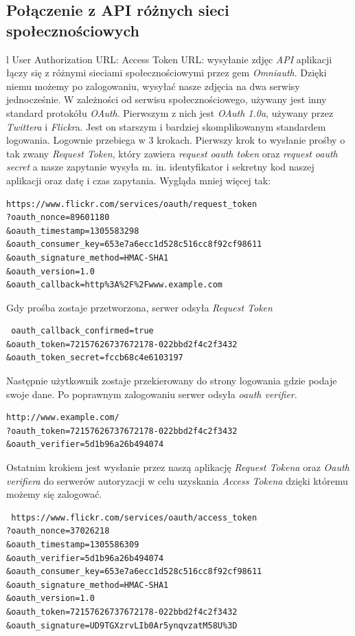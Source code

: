 \documentclass[openright]{xmgr}
\begin{document}
\subsection{Połączenie z API różnych sieci społecznościowych} l User Authorization URL: Access Token URL: wysyłanie zdjęc
\textit{API} aplikacji łączy się z różnymi sieciami społecznościowymi przez gem \textit{Omniauth}. Dzięki niemu możemy po zalogowaniu, wysyłać nasze zdjęcia na dwa serwisy jednocześnie. W zależności od serwisu społecznościowego, używany jest inny standard protokółu \textit{OAuth}. Pierwszym z nich jest \textit{OAuth 1.0a}, używany przez \textit{Twittera} i \textit{Flickr}a. Jest on starszym i bardziej skomplikowanym standardem logowania. Logownie przebiega w 3 krokach. Pierwszy krok to wysłanie prośby o tak zwany \textit{Request Token}, który zawiera \textit{request oauth token} oraz \textit{request oauth secret} a nasze zapytanie wysyła m. in.  identyfikator i sekretny kod naszej aplikacji oraz datę i czas zapytania. Wygląda mniej więcej tak:
\begin{verbatim}
https://www.flickr.com/services/oauth/request_token
?oauth_nonce=89601180
&oauth_timestamp=1305583298
&oauth_consumer_key=653e7a6ecc1d528c516cc8f92cf98611
&oauth_signature_method=HMAC-SHA1
&oauth_version=1.0
&oauth_callback=http%3A%2F%2Fwww.example.com
\end{verbatim}
\newpage
 Gdy prośba zostaje przetworzona, serwer odsyła \textit{Request Token} 
\begin{verbatim}
 oauth_callback_confirmed=true
&oauth_token=72157626737672178-022bbd2f4c2f3432
&oauth_token_secret=fccb68c4e6103197
\end{verbatim}
Następnie użytkownik zostaje przekierowany do strony logowania gdzie podaje swoje dane. Po poprawnym zalogowaniu serwer odsyła \textit{oauth verifier}.
\begin{verbatim}
http://www.example.com/
?oauth_token=72157626737672178-022bbd2f4c2f3432
&oauth_verifier=5d1b96a26b494074
\end{verbatim}
 Ostatnim krokiem jest wysłanie przez naszą aplikację \textit{Request Tokena} oraz \textit{Oauth verifiera} do serwerów autoryzacji w celu uzyskania \textit{Access Tokena} dzięki któremu możemy się zalogować.
 \begin{verbatim}
 https://www.flickr.com/services/oauth/access_token
?oauth_nonce=37026218
&oauth_timestamp=1305586309
&oauth_verifier=5d1b96a26b494074
&oauth_consumer_key=653e7a6ecc1d528c516cc8f92cf98611
&oauth_signature_method=HMAC-SHA1
&oauth_version=1.0
&oauth_token=72157626737672178-022bbd2f4c2f3432
&oauth_signature=UD9TGXzrvLIb0Ar5ynqvzatM58U%3D
\end{verbatim}
\end{document}
